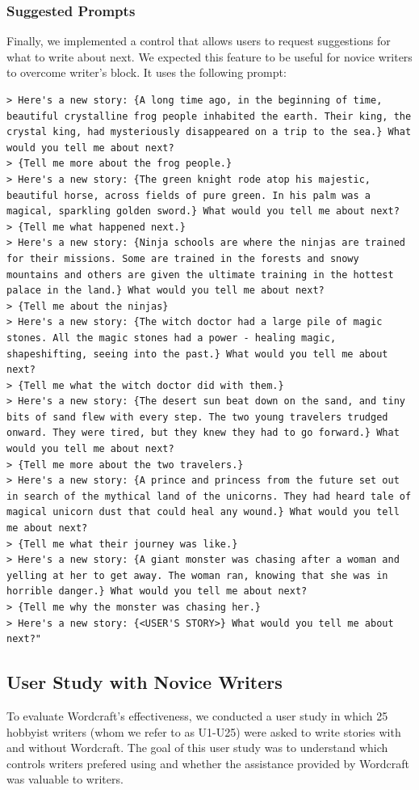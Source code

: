 \subsubsection {Suggested Prompts}
Finally, we implemented a control that allows users to request suggestions for what to write about next.
We expected this feature to be useful for novice writers to overcome writer's block.
It uses the following prompt:

\begin{lstlisting}
> Here's a new story: {A long time ago, in the beginning of time, beautiful crystalline frog people inhabited the earth. Their king, the crystal king, had mysteriously disappeared on a trip to the sea.} What would you tell me about next?
> {Tell me more about the frog people.}
> Here's a new story: {The green knight rode atop his majestic, beautiful horse, across fields of pure green. In his palm was a magical, sparkling golden sword.} What would you tell me about next?
> {Tell me what happened next.}
> Here's a new story: {Ninja schools are where the ninjas are trained for their missions. Some are trained in the forests and snowy mountains and others are given the ultimate training in the hottest palace in the land.} What would you tell me about next?
> {Tell me about the ninjas}
> Here's a new story: {The witch doctor had a large pile of magic stones. All the magic stones had a power - healing magic, shapeshifting, seeing into the past.} What would you tell me about next?
> {Tell me what the witch doctor did with them.}
> Here's a new story: {The desert sun beat down on the sand, and tiny bits of sand flew with every step. The two young travelers trudged onward. They were tired, but they knew they had to go forward.} What would you tell me about next?
> {Tell me more about the two travelers.}
> Here's a new story: {A prince and princess from the future set out in search of the mythical land of the unicorns. They had heard tale of magical unicorn dust that could heal any wound.} What would you tell me about next?
> {Tell me what their journey was like.}
> Here's a new story: {A giant monster was chasing after a woman and yelling at her to get away. The woman ran, knowing that she was in horrible danger.} What would you tell me about next?
> {Tell me why the monster was chasing her.}
> Here's a new story: {<USER'S STORY>} What would you tell me about next?"
\end{lstlisting}

\subsection{User Study with Novice Writers}
To evaluate Wordcraft's effectiveness, we conducted a user study in which 25 hobbyist writers (whom we refer to as U1-U25) were asked to write stories with and without Wordcraft.
The goal of this user study was to understand which controls writers prefered using and whether the assistance provided by Wordcraft was valuable to writers.



